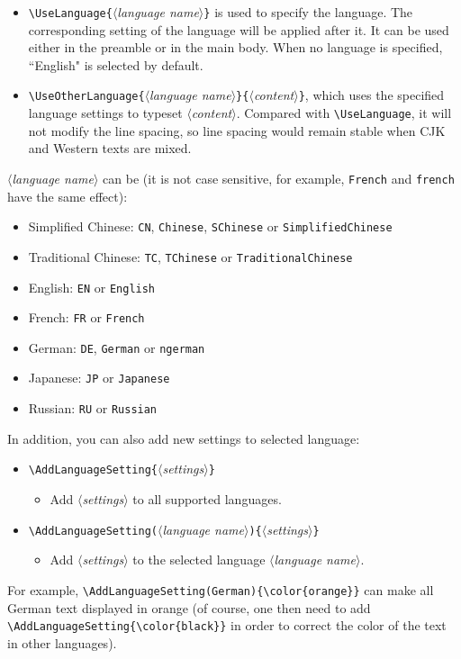 \documentclass{simplivre}
\providecommand{\meta}[1]{$\langle${\normalfont\itshape#1}$\rangle$}
\begin{document}
\begin{itemize}
    \item \lstinline|\UseLanguage{|\meta{language name}\lstinline|}| is used to specify the language. The corresponding setting of the language will be applied after it. It can be used either in the preamble or in the main body. When no language is specified, ``English" is selected by default.
    \item \lstinline|\UseOtherLanguage{|\meta{language name}\lstinline|}{|\meta{content}\lstinline|}|, which uses the specified language settings to typeset \meta{content}. Compared with \lstinline|\UseLanguage|, it will not modify the line spacing, so line spacing would remain stable when CJK and Western texts are mixed.
\end{itemize}

\meta{language name} can be (it is not case sensitive, for example, \texttt{French} and \texttt{french} have the same effect):
\begin{itemize}
    \item Simplified Chinese: \texttt{CN}, \texttt{Chinese}, \texttt{SChinese} or \texttt{SimplifiedChinese}
    \item Traditional Chinese: \texttt{TC}, \texttt{TChinese} or \texttt{TraditionalChinese}
    \item English: \texttt{EN} or \texttt{English}
    \item French: \texttt{FR} or \texttt{French}
    \item German: \texttt{DE}, \texttt{German} or \texttt{ngerman}
    \item Japanese: \texttt{JP} or \texttt{Japanese}
    \item Russian: \texttt{RU} or \texttt{Russian}
\end{itemize}

\medskip
In addition, you can also add new settings to selected language:
\begin{itemize}
    \item \lstinline|\AddLanguageSetting{|\meta{settings}\lstinline|}|
    \begin{itemize}
        \item Add \meta{settings} to all supported languages.
    \end{itemize}
    \item \lstinline|\AddLanguageSetting(|\meta{language name}\lstinline|){|\meta{settings}\lstinline|}|
    \begin{itemize}
        \item Add \meta{settings} to the selected language \meta{language name}.
    \end{itemize}
\end{itemize}
For example, \lstinline|\AddLanguageSetting(German){\color{orange}}| can make all German text displayed in orange (of course, one then need to add \lstinline|\AddLanguageSetting{\color{black}}| in order to correct the color of the text in other languages).
\end{document}
